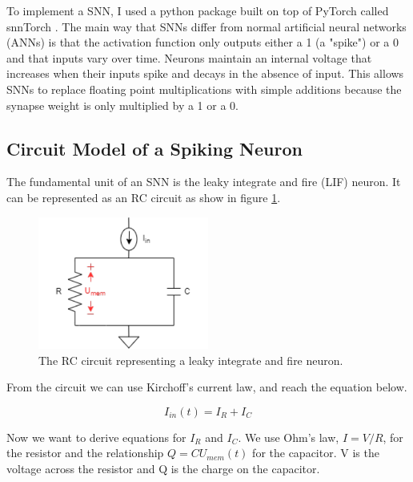 \documentclass[../taasin.tex]{subfiles}
\begin{document}
\label{appendix:snn}


To implement a SNN, I used a python package built on top of PyTorch called snnTorch \cite{snnTorch}. The main way that SNNs differ from normal artificial neural networks (ANNs) is that the activation function only outputs either a 1 (a "spike") or a 0 and that inputs vary over time. Neurons maintain an internal voltage that increases when their inputs spike and decays in the absence of input. This allows SNNs to replace floating point multiplications with simple additions because the synapse weight is only multiplied by a 1 or a 0.


\subsection{Circuit Model of a Spiking Neuron}

The fundamental unit of an SNN is the leaky integrate and fire (LIF) neuron. It can be represented as an RC circuit as show in figure \ref{fig:rc_circuit}.

\begin{figure}[h]
    \centering
    \includegraphics[width=0.5\textwidth]{figures/RC_neuron.pdf}
    \caption{The RC circuit representing a leaky integrate and fire neuron.}
    \label{fig:rc_circuit}
\end{figure}


From the circuit we can use Kirchoff's current law, and reach the equation below.

$$ I_{in}(t) = I_R + I_C $$

Now we want to derive equations for $ I_R $ and $ I_C $. We use Ohm's law, $ I = V/R $, for the resistor and the relationship $ Q = CU_{mem}(t) $ for the capacitor. V is the voltage across the resistor and Q is the charge on the capacitor.  
\end{document}
